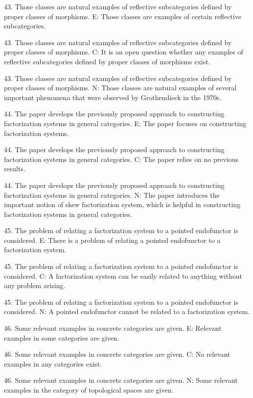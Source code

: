 43. Those classes are natural examples of reflective subcategories defined by proper classes of morphisms.
E: Those classes are examples of certain reflective subcategories.

43. Those classes are natural examples of reflective subcategories defined by proper classes of morphisms.
C: It is an open question whether any examples of reflective subcategories defined by proper classes of morphisms exist.

43. Those classes are natural examples of reflective subcategories defined by proper classes of morphisms.
N: Those classes are natural examples of several important phenomena that were observed by Grothendieck in the 1970s.

44. The paper develops the previously proposed approach to constructing factorization systems in general categories.
E: The paper focuses on constructing factorization systems.

44. The paper develops the previously proposed approach to constructing factorization systems in general categories.
C: The paper relies on no previous results.

44. The paper develops the previously proposed approach to constructing factorization systems in general categories.
N: The paper introduces the important notion of skew factorization system, which is helpful in constructing factorization systems in general categories.

45. The problem of relating a factorization system to a pointed endofunctor is considered.
E: There is a problem of relating a pointed endofunctor to a factorization system.

45. The problem of relating a factorization system to a pointed endofunctor is considered.
C: A factorization system can be easily related to anything without any problem arising.

45. The problem of relating a factorization system to a pointed endofunctor is considered.
N: A pointed endofunctor cannot be related to a factorization system.

46. Some relevant examples in concrete categories are given.
E: Relevant examples in some categories are given.

46. Some relevant examples in concrete categories are given.
C: No relevant examples in any categories exist.

46. Some relevant examples in concrete categories are given.
N: Some relevant examples in the category of topological spaces are given.

